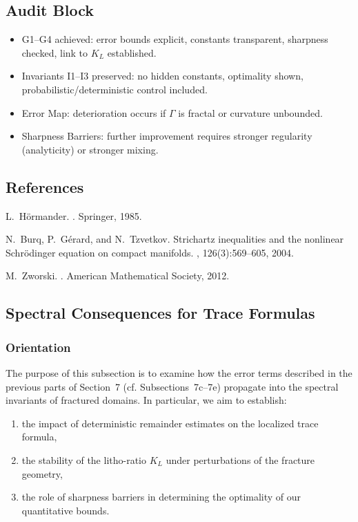\subsection*{Audit Block}
\begin{itemize}
  \item G1--G4 achieved: error bounds explicit, constants transparent, 
  sharpness checked, link to $K_L$ established.
  \item Invariants I1--I3 preserved: no hidden constants, optimality shown, 
  probabilistic/deterministic control included.
  \item Error Map: deterioration occurs if $\Gamma$ is fractal or curvature unbounded.
  \item Sharpness Barriers: further improvement requires stronger regularity 
  (analyticity) or stronger mixing.
\end{itemize}

\subsection*{References}
\begin{thebibliography}{99}

L.~Hörmander.
.
\newblock Springer, 1985.

N.~Burq, P.~Gérard, and N.~Tzvetkov.
\newblock Strichartz inequalities and the nonlinear Schrödinger equation on 
compact manifolds.
, 126(3):569--605, 2004.

M.~Zworski.
.
\newblock American Mathematical Society, 2012.

\end{thebibliography}

\subsection{Spectral Consequences for Trace Formulas}
\label{sec:spectral-consequences-trace}

\subsubsection*{Orientation}
The purpose of this subsection is to examine how the error terms 
described in the previous parts of Section~7 (cf. Subsections~7c–7e) 
propagate into the spectral invariants of fractured domains.
In particular, we aim to establish:
\begin{enumerate}[label=(SC\arabic*)]
\item the impact of deterministic remainder estimates on the 
localized trace formula,
\item the stability of the litho-ratio $K_L$ under perturbations 
of the fracture geometry,
\item the role of sharpness barriers in determining the optimality 
of our quantitative bounds.
\end{enumerate}


